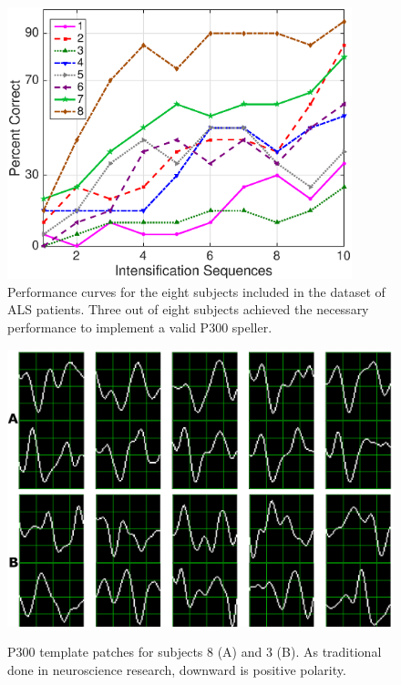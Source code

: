 \documentclass[utf8]{frontiersSCNS} %
\begin{document}
\begin{figure}[h!]
\centering
\includegraphics[width=10cm]{performance.eps}
\caption{Performance curves for the eight subjects included in the dataset of ALS patients.  Three out of eight subjects achieved the necessary performance to implement a valid P300 speller.}
\label{fig:performance}
\end{figure}


\begin{figure}[h!]
\centering
\includegraphics[width=15cm]{subject.png}\label{subject8}
\caption{P300 template patches for subjects 8 (A) and 3 (B). As traditional done in neuroscience research, downward is positive polarity. }
\label{fig:p300templates}
\end{figure}
\end{document}
